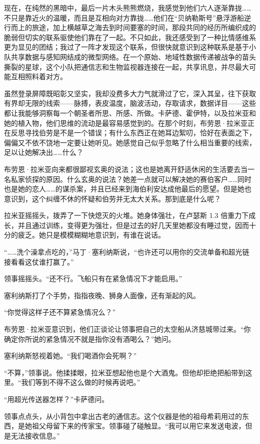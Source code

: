 \documentclass[AutoFakeBold=true]{book}
\begin{document}
现在，在纯然的黑暗中，最后一片木头熊熊燃烧，我感觉到他们六人逐渐靠拢……不只是靠近火的温暖，而且是互相向对方靠拢……他们在``贝纳勒斯号''悬浮游船逆行而上的旅途，加上横越草之海去到时间要塞的时间，那段共同的经历所编织成的脆弱但切实的联系驱使他们靠在了一起。不只如此，我还感受到了一种比情感维系更为显见的团结；我过了一阵才发现这个联系，但很快就意识到这种联系是基于小队共享数据与感知网结成的微型网络。在一个原始、地域性数据传递被战争的苗头撕裂的星球，这个小队把通信志和生物监视器连接在一起，共享讯息，并尽最大可能互相照料着对方。

虽然登录屏障既昭彰又坚实，我却没费多大力气就滑过了它，深入其呈，往下获取有界却无限的线索——脉搏，表皮温度，脑波活动，存取请求，数据详目——这些都让我能够洞察每一个朝圣者所思、所感、所做。卡萨德、霍伊特，以及拉米亚和她的植入物，他们思维的流动是最容易感觉到的。在那个时刻，布劳恩·拉米亚正在反思寻找伯劳是不是一个错误；有什么东西正在她耳边絮叨，恰好在表面之下，偏偏又不依不饶地一定要让她听见。她感觉自己似乎忽略了什么相当重要的线索，足以让她解决出……什么？

布劳恩·拉米亚向来都很鄙视玄奥的说法；这也是她离开舒适休闲的生活要去当一名私家侦探的原因。什么玄奥的说法？她差一点就可以解决她的赛伯客户……同时也是她的恋人……的谋杀案，并且已经来到海伯利安达成他最后的愿望。但是她也意识到，这个纠缠不休的怀疑和伯劳并无太大关系。那到底是什么呢？

拉米亚摇摇头，拨弄了一下快熄灭的火堆。她身体强壮，在卢瑟斯 1.3 倍重力下成长，并且通过训练，变得更为强壮，但是过去的好几天里她都没有睡过觉，因而十分的疲乏。她只是模模糊糊地意识到，有谁在说话。

\vspace*{1em}

``……洗个澡拿点吃的，''马丁·塞利纳斯说，``也许还可以用你的交流单备和超光链接看看这仗谁打赢了。''

领事摇摇头。``还不行。飞船只有在紧急情况下才能启用。''

塞利纳斯打了个手势，指指夜晚、狮身人面像，还有渐起的风。

``你觉得这样子还不算紧急情况么？''

布劳恩·拉米亚意识到，他们正谈论让领事把自己的太空船从济慈城带过来。``你确定你所说的紧急情况不就是指你没有酒喝么？''她问。

塞利纳斯怒视着她。``我们喝酒你会死啊？''

``不算，''领事说。他揉揉眼，拉米亚想起他也是个大酒鬼。但他却拒绝把船带到这里。``我们等到不得不这么做的时候再说吧。''

``用超光传送器怎样？''卡萨德问。

领事点点头，从小背包中拿出古老的通信志。这个仪器是他的祖母希莉用过的东西，是她祖父母留下来的传家宝。领事碰了碰触显。``我可以用它来发送电波，但是无法接收信息。''
\end{document}
